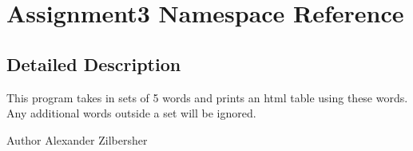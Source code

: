 \hypertarget{namespace_assignment3}{}\section{Assignment3 Namespace Reference}
\label{namespace_assignment3}


\subsection{Detailed Description}
This program takes in sets of 5 words and prints an html table using these words. Any additional words outside a set will be ignored.

\begin{DoxyAuthor}{Author}
Alexander Zilbersher 
\end{DoxyAuthor}
